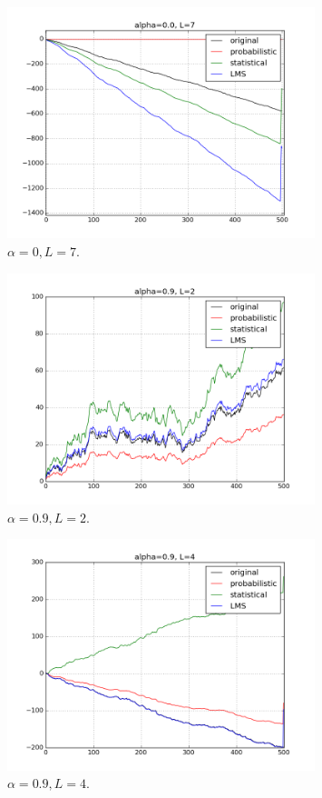 \begin{enumerate}[(a)]
\begin{figure}[htbp]
	\centering
	\includegraphics[width=0.8\textwidth]{images/p5-3}
	\caption{$\alpha=0, L=7$.}
	\label{fig:p5-3}
\end{figure}

\begin{figure}[htbp]
	\centering
	\includegraphics[width=0.8\textwidth]{images/p5-4}
	\caption{$\alpha=0.9, L=2$.}
	\label{fig:p5-4}
\end{figure}

\begin{figure}[htbp]
	\centering
	\includegraphics[width=0.8\textwidth]{images/p5-5}
	\caption{$\alpha=0.9, L=4$.}
	\label{fig:p5-5}
\end{figure}


\end{enumerate}
